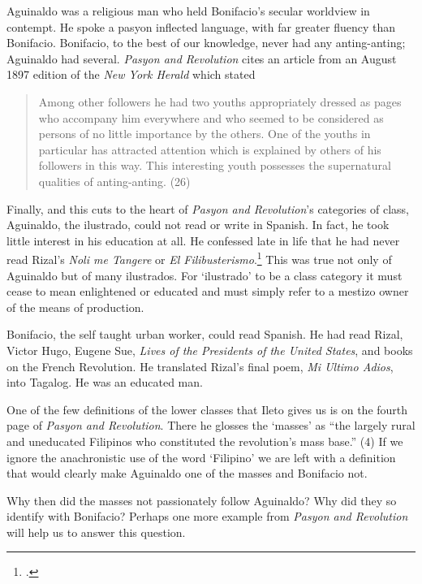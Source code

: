 Aguinaldo was a religious man who held Bonifacio's secular worldview in contempt. He spoke a pasyon inflected language, with far greater fluency than Bonifacio. Bonifacio, to the best of our knowledge, never had any anting-anting; Aguinaldo had several. \textit{Pasyon and Revolution} cites an article from an August 1897 edition of the \textit{New York Herald} which stated

\begin{quote}
Among other followers he  had two youths appropriately dressed as pages who accompany him everywhere and who seemed to be considered as persons of no little importance by the others. One of the youths in particular has attracted attention which is explained by others of his followers in this way. This interesting youth possesses the supernatural qualities of anting-anting. (26)
\end{quote}

Finally, and this cuts to the heart of \textit{Pasyon and Revolution}'s categories of class, Aguinaldo, the ilustrado, could not read or write in Spanish. In fact, he took little interest in his education at all. He confessed late in life that he had never read Rizal's \textit{Noli me Tangere} or \textit{El Filibusterismo}.\footcite[144]{Ocampo2001} This was true not only of Aguinaldo but of many ilustrados. For \enquote*{ilustrado} to be a class category it must cease to mean enlightened or educated and must simply refer to a mestizo owner of the means of production. 

Bonifacio, the self taught urban worker, could read Spanish. He had read Rizal, Victor Hugo, Eugene Sue, \textit{Lives of the Presidents of the United States}, and books on the French Revolution. He translated Rizal's final poem, \textit{Mi Ultimo Adios}, into Tagalog. He was an educated man.

One of the few definitions of the lower classes that Ileto gives us is on the fourth page of \textit{Pasyon and Revolution}. There he glosses the \enquote*{masses} as \enquote{the largely rural and uneducated Filipinos who constituted the revolution's mass base.} (4) If we ignore the anachronistic use of the word \enquote*{Filipino} we are left with a definition that would clearly make Aguinaldo one of the masses and Bonifacio not.

Why then did the masses not passionately follow Aguinaldo? Why did they so identify with Bonifacio? Perhaps one more example from \textit{Pasyon and Revolution} will help us to answer this question. 

